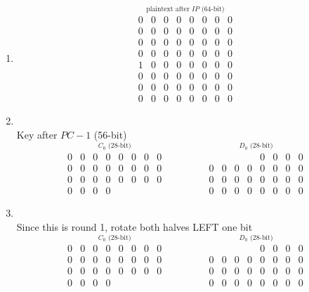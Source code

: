 \documentclass[12pt]{article}
\begin{document}
\begin{enumerate}
\begin{enumerate}
\begin{enumerate}
			\item
				\[
				\stackrel{\mbox{plaintext after $IP$ (64-bit)}}{
				\begin{matrix}
					0&0&0&0&0&0&0&0\\ 
					0&0&0&0&0&0&0&0\\
					0&0&0&0&0&0&0&0\\
					0&0&0&0&0&0&0&0\\
					1&0&0&0&0&0&0&0\\
					0&0&0&0&0&0&0&0\\
					0&0&0&0&0&0&0&0\\
					0&0&0&0&0&0&0&0
				\end{matrix}}
				\]
				
			\item
				\quad\\
				Key after $PC-1$ (56-bit)
				\[
				\stackrel{\mbox{$C_0$ (28-bit)}}{
				\begin{matrix}
					0&0&0&0&0&0&0&0\\ 
					0&0&0&0&0&0&0&0\\
					0&0&0&0&0&0&0&0\\
					0&0&0&0
				\end{matrix}}\quad\quad\quad\quad
				\stackrel{\mbox{$D_0$ (28-bit)}}{
				\begin{matrix}
					{}&{}&{}&{}&0&0&0&0\\ 
					0&0&0&0&0&0&0&0\\
					0&0&0&0&0&0&0&0\\
					0&0&0&0&0&0&0&0
				\end{matrix}}
				\]
				
			\item
				\quad\\
				Since this is round 1, rotate both halves LEFT one bit
				\[
				\stackrel{\mbox{$C_0$ (28-bit)}}{
				\begin{matrix}
					0&0&0&0&0&0&0&0\\ 
					0&0&0&0&0&0&0&0\\
					0&0&0&0&0&0&0&0\\
					0&0&0&0
				\end{matrix}}\quad\quad\quad\quad
				\stackrel{\mbox{$D_0$ (28-bit)}}{
				\begin{matrix}
					{}&{}&{}&{}&0&0&0&0\\ 
					0&0&0&0&0&0&0&0\\
					0&0&0&0&0&0&0&0\\
					0&0&0&0&0&0&0&0
				\end{matrix}}
				\]
				

\end{enumerate}
\end{enumerate}
\end{enumerate}
\end{document}
